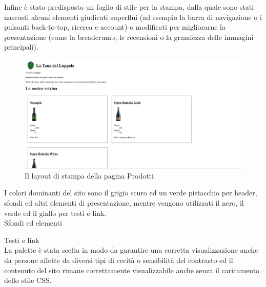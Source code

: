 \pagebreak

Infine è stato predisposto un foglio di stile per la stampa, dalla quale sono stati nascosti alcuni elementi giudicati superflui (ad esempio la barra di navigazione o i pulsanti back-to-top, ricerca e account) o modificati per migliorarne la presentazione (come la breadcrumb, le recensioni o la grandezza delle immagini principali).

\begin{figure}[H]
	\centering
	\caption{Il layout di stampa della pagina Prodotti}
	\includegraphics[width=16cm]{utility/prodotti_printcss.png}
\end{figure}

I colori dominanti del sito sono il grigio scuro ed un verde pistacchio per header, sfondi ed altri elementi di presentazione, mentre vengono utilizzati il nero, il verde ed il giallo per testi e link.\\

Sfondi ed elementi
\crule[hdgray]{1cm}{1cm} \crule[pistacho]{1cm}{1cm} \crule[puffo]{1cm}{1cm} 


Testi e link
\crule{1cm}{1cm} \crule[yellow]{1cm}{1cm} \crule[bcgreen]{1cm}{1cm} \crule[hdgreen]{1cm}{1cm}
\\

La palette è stata scelta in modo da garantire una corretta visualizzazione anche da persone affette da diversi tipi di cecità o sensibilità del contrasto ed il contenuto del sito rimane correttamente visualizzabile anche senza il caricamento dello stile CSS.

